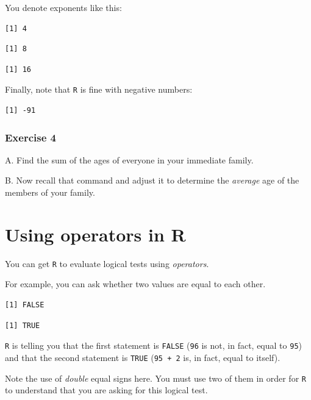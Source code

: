 \documentclass[
]{book}
\begin{document}
You denote exponents like this:

\begin{verbatim}
[1] 4
\end{verbatim}

\begin{verbatim}
[1] 8
\end{verbatim}

\begin{verbatim}
[1] 16
\end{verbatim}

Finally, note that \texttt{R} is fine with negative numbers:

\begin{verbatim}
[1] -91
\end{verbatim}

\hypertarget{exercise-4}{%
\subsubsection*{Exercise 4}\label{exercise-4}}

A. Find the sum of the ages of everyone in your immediate family.

B. Now recall that command and adjust it to determine the \emph{average} age of the members of your family.

\hypertarget{using-operators-in-r}{%
\section{Using operators in R}\label{using-operators-in-r}}

You can get \texttt{R} to evaluate logical tests using \emph{operators}.

For example, you can ask whether two values are equal to each other.

\begin{verbatim}
[1] FALSE
\end{verbatim}

\begin{verbatim}
[1] TRUE
\end{verbatim}

\texttt{R} is telling you that the first statement is \texttt{FALSE} (\texttt{96} is not, in fact, equal to \texttt{95}) and that the second statement is \texttt{TRUE} (\texttt{95\ +\ 2} is, in fact, equal to itself).

Note the use of \emph{double} equal signs here. You must use two of them in order for \texttt{R} to understand that you are asking for this logical test.
\end{document}
